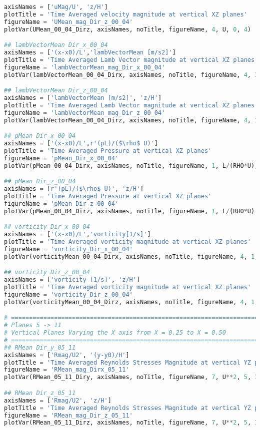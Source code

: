 \begin{lstlisting}[language=python]
axisNames = ['uMag/U', 'z/H']
plotTitle = 'Time Averaged velocity magnitude at vertical XZ planes'
figureName = 'UMean_mag_Dir_z_00_04'
plotVar(UMean_00_04_Dirz, axisNames, noTitle, figureName, 4, U, 0, 4)

## lambVectorMean Dir_x_00_04
axisNames = ['(x-x0)/L','lambVectorMean [m/s2]']
plotTitle = 'Time Averaged Lamb Vector magnitude at vertical XZ planes'
figureName = 'lambVectorMean_mag_Dir_x_00_04'
plotVar(lambVectorMean_00_04_Dirx, axisNames, noTitle, figureName, 4, 1, 0, 4)

## lambVectorMean Dir_z_00_04
axisNames = ['lambVectorMean [m/s2]', 'z/H']
plotTitle = 'Time Averaged Lamb Vector magnitude at vertical XZ planes'
figureName = 'lambVectorMean_mag_Dir_z_00_04'
plotVar(lambVectorMean_00_04_Dirz, axisNames, noTitle, figureName, 4, 1, 0, 4)

## pMean Dir_x_00_04
axisNames = ['(x-x0)/L',r'(pL)/($\rho$ U)']
plotTitle = 'Time Averaged Pressure at vertical XZ planes'
figureName = 'pMean_Dir_x_00_04'
plotVar(pMean_00_04_Dirx, axisNames, noTitle, figureName, 1, L/(RHO*U), 0, 4)

## pMean Dir_z_00_04
axisNames = [r'(pL)/($\rho$ U)', 'z/H']
plotTitle = 'Time Averaged Pressure at vertical XZ planes'
figureName = 'pMean_Dir_z_00_04'
plotVar(pMean_00_04_Dirz, axisNames, noTitle, figureName, 1, L/(RHO*U), 0, 4)

## vorticity Dir_x_00_04
axisNames = ['(x-x0)/L','vorticity[1/s]']
plotTitle = 'Time Averaged vorticity magnitude at vertical XZ planes'
figureName = 'vorticity_Dir_x_00_04'
plotVar(vorticityMean_00_04_Dirx, axisNames, noTitle, figureName, 4, 1, 0, 4)

## vorticity Dir_z_00_04
axisNames = ['vorticity [1/s]', 'z/H']
plotTitle = 'Time Averaged vorticity magnitude at vertical XZ planes'
figureName = 'vorticity_Dir_z_00_04'
plotVar(vorticityMean_00_04_Dirz, axisNames, noTitle, figureName, 4, 1, 0, 4)

# =============================================================================
# Planes 5 -> 11
# Vertical Planes Varying the X axis from X = 0.25 to X = 0.50
# =============================================================================
## RMean Dir_y_05_11
axisNames = ['Rmag/U2', '(y-y0)/H']
plotTitle = 'Time Averaged Reynolds Stresses Magnitude at vertical YZ planes'
figureName = 'RMean_mag_Dirx_05_11'
plotVar(RMean_05_11_Diry, axisNames, noTitle, figureName, 7, U**2, 5, 11)

## RMean Dir_z_05_11
axisNames = ['Rmag/U2', 'z/H']
plotTitle = 'Time Averaged Reynolds Stresses Magnitude at vertical YZ planes'
figureName = 'RMean_mag_Dir_z_05_11'
plotVar(RMean_05_11_Dirz, axisNames, noTitle, figureName, 7, U**2, 5, 11)


\end{lstlisting}
